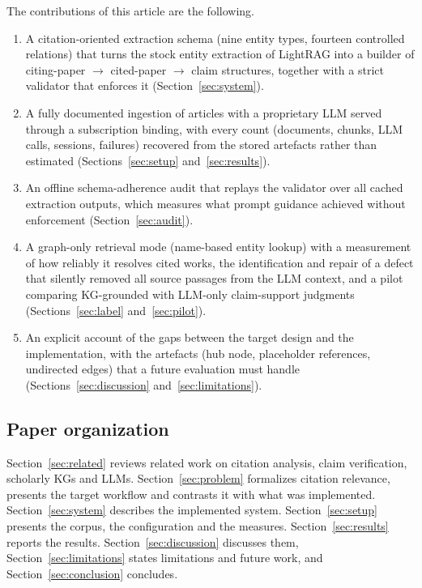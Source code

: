\documentclass[lettersize,journal]{IEEEtran}
\begin{document}
The contributions of this article are the following.
\begin{enumerate}
\item A citation-oriented extraction schema (nine entity types, fourteen controlled relations) that turns the stock entity extraction of LightRAG into a builder of citing-paper $\rightarrow$ cited-paper $\rightarrow$ claim structures, together with a strict validator that enforces it (Section~\ref{sec:system}).
\item A fully documented ingestion of \nDocsProcessed{} articles with a proprietary LLM served through a subscription binding, with every count (documents, chunks, LLM calls, sessions, failures) recovered from the stored artefacts rather than estimated (Sections~\ref{sec:setup} and~\ref{sec:results}).
\item An offline schema-adherence audit that replays the validator over all \auditRecords{} cached extraction outputs, which measures what prompt guidance achieved without enforcement (Section~\ref{sec:audit}).
\item A graph-only retrieval mode (name-based entity lookup) with a measurement of how reliably it resolves cited works, the identification and repair of a defect that silently removed all source passages from the LLM context, and a pilot comparing KG-grounded with LLM-only claim-support judgments (Sections~\ref{sec:label} and~\ref{sec:pilot}).
\item An explicit account of the gaps between the target design and the implementation, with the artefacts (hub node, placeholder references, undirected edges) that a future evaluation must handle (Sections~\ref{sec:discussion} and~\ref{sec:limitations}).
\end{enumerate}

\subsection{Paper organization}

Section~\ref{sec:related} reviews related work on citation analysis, claim verification, scholarly KGs and LLMs. Section~\ref{sec:problem} formalizes citation relevance, presents the target workflow and contrasts it with what was implemented. Section~\ref{sec:system} describes the implemented system. Section~\ref{sec:setup} presents the corpus, the configuration and the measures. Section~\ref{sec:results} reports the results. Section~\ref{sec:discussion} discusses them, Section~\ref{sec:limitations} states limitations and future work, and Section~\ref{sec:conclusion} concludes.
\end{document}
